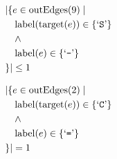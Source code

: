 \begin{align*}
&|\{e \in \mathrm{outEdges}(9)  \mid \\
&\quad \mathrm{label}(\mathrm{target}(e)) \in \{ \text{`\texttt{S}'} \}\\
&\quad \wedge\\
&\quad \mathrm{label}(e) \in \{ \text{`\texttt{-}'} \}\\
&\}| \leq 1
\end{align*}

\begin{align*}
&|\{e \in \mathrm{outEdges}(2)  \mid \\
&\quad \mathrm{label}(\mathrm{target}(e)) \in \{ \text{`\texttt{C}'} \}\\
&\quad \wedge\\
&\quad \mathrm{label}(e) \in \{ \text{`\texttt{=}'} \}\\
&\}| = 1
\end{align*}

